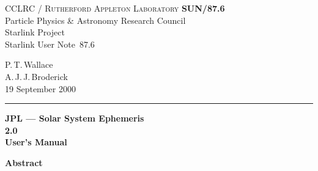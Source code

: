 \documentclass[twoside,11pt]{article}
\newcommand{\stardoccategory}  {Starlink User Note}
\newcommand{\stardocinitials}  {SUN}
\newcommand{\stardocnumber}    {87.6}
\newcommand{\stardocauthors}   {P.\,T.\,Wallace \\ A.\,J.\,J.\,Broderick}
\newcommand{\stardocdate}      {19 September 2000}
\newcommand{\stardoctitle}     {JPL --- Solar System Ephemeris}
\newcommand{\stardocversion}   {2.0}
\newcommand{\stardocmanual}    {User's Manual}
\newcommand{\stardocname}{\stardocinitials /\stardocnumber}
\newenvironment{latexonly}{}{}
\renewcommand{\_}{\texttt{\symbol{95}}}
\begin{document}
\thispagestyle{empty}

\begin{latexonly}
   CCLRC / \textsc{Rutherford Appleton Laboratory} \hfill \textbf{\stardocname}\\
   {\large Particle Physics \& Astronomy Research Council}\\
   {\large Starlink Project\\}
   {\large \stardoccategory\ \stardocnumber}
   \begin{flushright}
   \stardocauthors\\
   \stardocdate
   \end{flushright}
   \vspace{-4mm}
   \rule{\textwidth}{0.5mm}
   \vspace{5mm}
   \begin{center}
   {\Huge\textbf{\stardoctitle \\ [2.5ex]}}
   {\LARGE\textbf{\stardocversion \\ [4ex]}}
   {\Huge\textbf{\stardocmanual}}
   \end{center}
   \vspace{5mm}


   \vspace{10mm}
   \begin{center}
      {\Large\textbf{Abstract}}
   \end{center}
\end{latexonly}
\end{document}
